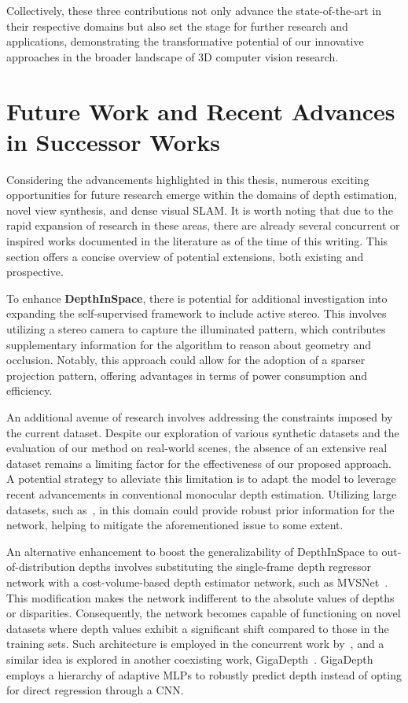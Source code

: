  Collectively, these three contributions not only advance the state-of-the-art in their respective domains but also set the stage for further research and applications, demonstrating the transformative potential of our innovative approaches in the broader landscape of 3D computer vision research.

\section{Future Work and Recent Advances in Successor Works}

Considering the advancements highlighted in this thesis, numerous exciting opportunities for future research emerge within the domains of depth estimation, novel view synthesis, and dense visual SLAM. It is worth noting that due to the rapid expansion of research in these areas, there are already several concurrent or inspired works documented in the literature as of the time of this writing. This section offers a concise overview of potential extensions, both existing and prospective.


To enhance \textbf{DepthInSpace}, there is potential for additional investigation into expanding the self-supervised framework to include active stereo. This involves utilizing a stereo camera to capture the illuminated pattern, which contributes supplementary information for the algorithm to reason about geometry and occlusion. Notably, this approach could allow for the adoption of a sparser projection pattern, offering advantages in terms of power consumption and efficiency.

An additional avenue of research involves addressing the constraints imposed by the current dataset. Despite our exploration of various synthetic datasets and the evaluation of our method on real-world scenes, the absence of an extensive real dataset remains a limiting factor for the effectiveness of our proposed approach. A potential strategy to alleviate this limitation is to adapt the model to leverage recent advancements in conventional monocular depth estimation. Utilizing large datasets, such as~\cite{ranftl2020towards}, in this domain could provide robust prior information for the network, helping to mitigate the aforementioned issue to some extent.

An alternative enhancement to boost the generalizability of DepthInSpace to out-of-distribution depths involves substituting the single-frame depth regressor network with a cost-volume-based depth estimator network, such as MVSNet~\citep{yao2018mvsnet}. This modification makes the network indifferent to the absolute values of depths or disparities. Consequently, the network becomes capable of functioning on novel datasets where depth values exhibit a significant shift compared to those in the training sets. Such architecture is employed in the concurrent work by~\cite{li2023self}, and a similar idea is explored in another coexisting work, GigaDepth~\citep{schreiberhuber2022gigadepth}. GigaDepth employs a hierarchy of adaptive MLPs to robustly predict depth instead of opting for direct regression through a CNN.

